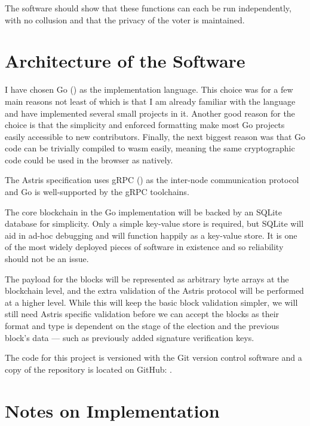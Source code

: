 The software should show that these functions can each be run independently, with no collusion and that the privacy of the voter is maintained.

\section{Architecture of the Software}
\label{ch:sw:architecture}

I have chosen Go () as the implementation language. This choice was for a few main reasons not least of which is that I am already familiar with the language and have implemented several small projects in it. Another good reason for the choice is that the simplicity and enforced formatting make most Go projects easily accessible to new contributors. Finally, the next biggest reason was that Go code can be trivially compiled to \gls{wasm} easily, meaning the same cryptographic code could be used in the browser as natively.

The Astris specification uses gRPC () as the inter-node communication protocol and Go is well-supported by the gRPC toolchains.

The core blockchain in the Go implementation will be backed by an SQLite database for simplicity. Only a simple key-value store is required, but SQLite will aid in ad-hoc debugging and will function happily as a key-value store. It is one of the most widely deployed pieces of software in existence \cite{MostWidelyDeployed} and so reliability should not be an issue.

The payload for the blocks will be represented as arbitrary byte arrays at the blockchain level, and the extra validation of the Astris protocol will be performed at a higher level. While this will keep the basic block validation simpler, we will still need Astris specific validation before we can accept the blocks as their format and type is dependent on the stage of the election and the previous block's data --- such as previously added signature verification keys.

The code for this project is versioned with the Git version control software and a copy of the repository is located on GitHub: \surl{\astrisrepo}.

\section{Notes on Implementation}
\label{ch:sw:notes}

